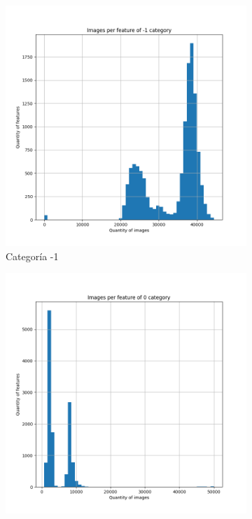 \documentclass[12,twoside]{TFG-GM}
\theoremstyle{definition}
\theoremstyle{remark}
\begin{document}
\begin{figure}[ht] 
	\centering
	\begin{subfigure}[b]{0.3\textwidth}
		\includegraphics[width=\textwidth] {Images/plots/25/Images_per_feature_of_-1_category.png}
		\caption{Categoría -1}
	\end{subfigure}
	\begin{subfigure}[b]{0.3\textwidth}
		\includegraphics[width=\textwidth]  {Images/plots/25/Images_per_feature_of_0_category.png}

\end{subfigure}
\end{figure}
\end{document}

